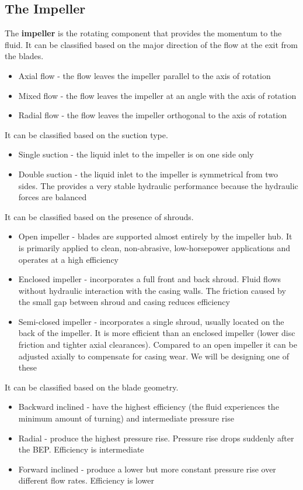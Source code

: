 \subsection{The Impeller}
The \textbf{impeller} is the rotating component that provides the momentum to the fluid. It can be classified based on the major direction of the flow at the exit from the blades.
\begin{itemize}
  \item Axial flow - the flow leaves the impeller parallel to the axis of rotation
  \item Mixed flow - the flow leaves the impeller at an angle with the axis of rotation
  \item Radial flow - the flow leaves the impeller orthogonal to the axis of rotation
\end{itemize}
It can be classified based on the suction type.
\begin{itemize}
  \item Single suction - the liquid inlet to the impeller is on one side only
  \item Double suction - the liquid inlet to the impeller is symmetrical from two sides. The provides a very stable hydraulic performance because the hydraulic forces are balanced
\end{itemize}
It can be classified based on the presence of shrouds.
\begin{itemize}
  \item Open impeller - blades are supported almost entirely by the impeller hub. It is primarily applied to clean, non-abrasive, low-horsepower applications and operates at a high efficiency
  \item Enclosed impeller - incorporates a full front and back shroud. Fluid flows without hydraulic interaction with the casing walls. The friction caused by the small gap between shroud and casing reduces efficiency
  \item Semi-closed impeller - incorporates a single shroud, usually located on the back of the impeller. It is more efficient than an enclosed impeller (lower disc friction and tighter axial clearances). Compared to an open impeller it can be adjusted axially to compensate for casing wear. We will be designing one of these
\end{itemize}
It can be classified based on the blade geometry.
\begin{itemize}
  \item Backward inclined - have the highest efficiency (the fluid experiences the minimum amount of turning) and intermediate pressure rise
  \item Radial - produce the highest pressure rise. Pressure rise drops suddenly after the BEP. Efficiency is intermediate
  \item Forward inclined - produce a lower but more constant pressure rise over different flow rates. Efficiency is lower
\end{itemize}
